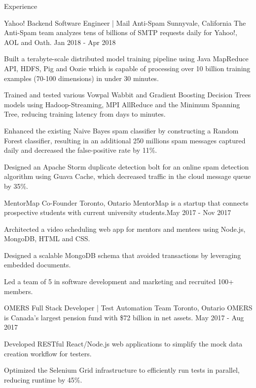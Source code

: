 \documentclass{resume} %
\begin{document}
\begin{rSection}{Experience}

\begin{expSec}
{Yahoo!}
{Backend Software Engineer | Mail Anti-Spam}
{Sunnyvale, California}
{The Anti-Spam team analyzes tens of billions of SMTP requests daily for Yahoo!, AOL and Oath.}
{Jan 2018 - Apr 2018}
\item Built a terabyte-scale distributed model training pipeline using Java MapReduce API, HDFS, Pig and Oozie which is capable of processing over 10 billion training examples (70-100 dimensions) in under 30 minutes.
\item Trained and tested various Vowpal Wabbit and Gradient Boosting Decision Trees models using Hadoop-Streaming, MPI AllReduce and the Minimum Spanning Tree, reducing training latency from days to minutes.
\item Enhanced the existing Naive Bayes spam classifier by constructing a Random Forest classifier, resulting in an additional 250 millions spam messages captured daily and decreased the false-positive rate by 11\%.
\item Designed an Apache Storm duplicate detection bolt for an online spam detection algorithm using Guava Cache, which decreased traffic in the cloud message queue by 35\%.

\end{expSec}

\begin{expSec}
{MentorMap}
{Co-Founder \href{https://www.mentormap.ca/}{\space\small\faExternalLink}}
{Toronto, Ontario}
{MentorMap is a startup that connects prospective students with current university students.}{May 2017 - Nov 2017}
\item Architected a video scheduling web app for mentors and mentees using Node.js, MongoDB, HTML and CSS.
\item Designed a scalable MongoDB schema that avoided transactions by leveraging embedded documents.
\item Led a team of 5 in software development and marketing and recruited 100+ members.
\end{expSec}

\begin{expSec}
{OMERS}
{Full Stack Developer | Test Automation Team}
{Toronto, Ontario}
{OMERS is Canada's largest pension fund with \$72 billion in net assets.}
{May 2017 - Aug 2017}
\item Developed RESTful React/Node.js web applications to simplify the mock data creation workflow for testers.
\item Optimized the Selenium Grid infrastructure to efficiently run tests in parallel, reducing runtime by 45\%. \end{expSec}

\end{rSection}
\end{document}
